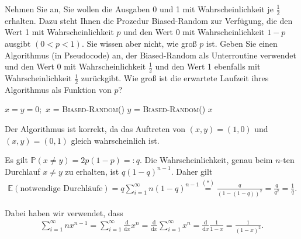 
\begin{exercise}

\phantom{}Nehmen Sie an, Sie wollen die Ausgaben 0 und 1 mit Wahrscheinlichkeit je $\frac{1}{2}$ erhalten. Dazu steht Ihnen die Prozedur Biased-Random zur Verfügung, die den Wert 1 mit Wahrscheinlichkeit $p$ und den Wert 0 mit Wahrscheinlichkeit $1-p$ ausgibt $(0 < p < 1)$. Sie wissen aber nicht, wie groß $p$ ist. Geben Sie einen Algorithmus (in Pseudocode) an, der Biased-Random als Unterroutine verwendet und den Wert 0 mit Wahrscheinlichkeit $\frac{1}{2}$ und den Wert 1 ebenfalls mit Wahrscheinlichkeit $\frac{1}{2}$ zurückgibt. Wie groß ist die erwartete Laufzeit ihres Algorithmus als Funktion von $p$?

\end{exercise}



\begin{solution}

  \begin{algorithm}
      \begin{algorithmic}[1]
          \State $x = y = 0;$
              \State $x$ = \textsc{Biased-Random()}
              \State $y$ = \textsc{Biased-Random()}
          \EndWhile
          \Return $x$
          \EndProcedure
      \end{algorithmic}
  \end{algorithm}

Der Algorithmus ist \glqq korrekt\grqq{}, da das Auftreten von $(x, y) = (1, 0)$ und $(x, y) = (0, 1)$ gleich wahrscheinlich ist.

Es gilt $\mathbb P(x \neq y) = 2p(1-p) =\colon q$. Die Wahrscheinlichkeit, genau beim $n$-ten Durchlauf $x \neq y$ zu erhalten, ist $q (1-q)^{n-1}$. Daher gilt
\begin{align*}
    \mathbb E(\text{notwendige Durchläufe}) = q \sum_{i = 1}^\infty n (1-q)^{n-1} \stackrel{(\ast)}{=} \frac{q}{(1-(1-q))^2} = \frac{q}{q^2} = \frac{1}{q}.
\end{align*}

Dabei haben wir verwendet, dass
\begin{align}\tag{$\ast$}
    \sum_{i = 1}^\infty nx^{n-1} = \sum_{i = 1}^\infty \frac{\mathrm d}{\mathrm dx} x^n =
    \frac{\mathrm d}{\mathrm dx} \sum_{i = 1}^\infty x^n =
    \frac{\mathrm d}{\mathrm dx} \frac{1}{1-x} = \frac{1}{(1-x)^2}.
\end{align}

\end{solution}
